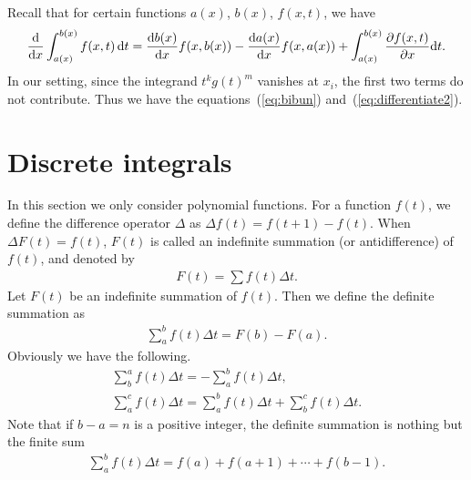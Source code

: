 \documentclass[pdftex]{sigma}
\numberwithin{equation}{section}
\newcommand{\sint}{\sum\nolimits}
\begin{document}
\begin{Remark}
\label{rem:details}
Recall that for certain functions $a(x)$, $b(x)$, $f(x, t)$, we have
\begin{gather*}
\frac{{\rm d}}{{\rm d}x}\int_{a(x)}^{b(x)}f(x, t)\,{\rm d}t=
\frac{{\rm d}b(x)}{{\rm d}x}f(x, b(x))-\frac{{\rm d}a(x)}{{\rm d}x}f(x, a(x))+
\int_{a(x)}^{b(x)}\frac{\partial f(x, t)}{\partial x}{\rm d}t.
\end{gather*}
In our setting, since the integrand $t^kg(t)^m$ vanishes at
$x_i$, the first two terms do not contribute. Thus we have
the equations~(\ref{eq:bibun}) and~(\ref{eq:differentiate2}).
\end{Remark}

\section{Discrete integrals}
\label{sec:discreteint}

In this section we only consider polynomial functions.
For a function $f(t)$, we define the difference operator $\Delta$ as
$\Delta f(t)=f(t+1)-f(t)$. When $\Delta F(t)=f(t)$,
$F(t)$ is called an indefinite summation (or antidifference)
of $f(t)$, and denoted by
\begin{gather*}
F(t)=\sint f(t)\Delta t.
\end{gather*}
Let $F(t)$ be an indefinite summation of $f(t)$. Then
we define the definite summation as
\begin{gather*}
\sint_a^b f(t)\Delta t=F(b)-F(a).
\end{gather*}
Obviously we have the following.
\begin{gather*}
\sint_b^af(t)\Delta t=-\sint_a^bf(t)\Delta t,
\\
\sint_a^cf(t)\Delta t=\sint_a^bf(t)\Delta t + \sint_b^cf(t)\Delta t.
\end{gather*}
Note that if $b-a=n$ is a positive integer, the definite summation
is nothing but the finite sum
\begin{gather}
\label{sumformula}
\sint_a^b f(t)\Delta t=f(a)+f(a+1)+\cdots+f(b-1).
\end{gather}
\end{document}

